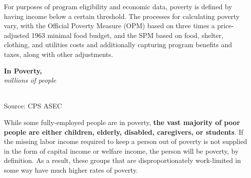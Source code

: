 \documentclass{report}
\newcommand{\barylab}[2]{yticklabel style={text width=#1, align=right, 
		style={black!70}, text height=#2},}
\newcommand{\bbar}[2]{extra #1 ticks = {{#2}}, extra #1 tick labels = ,
		extra #1 tick style = {grid=major, grid style={thick, black!25}},}
\newcommand{\barplotnogrid}{xbar=0pt, axis line style={draw=none},
	    yticklabel style={align=left, anchor=east},
      		xmajorticks=false, ymajorgrids=false,   
	    ytick=data, tickwidth=0pt, area legend, reverse legend,
	    nodes near coords align={horizontal},}
\begin{document}
{\begin{minipage}{0.76\textwidth}
For purposes of program eligibility and economic data, poverty is defined by having income below a certain threshold. The processes for calculating poverty vary, with the Official Poverty Measure (OPM) based on three times a price-adjusted 1963 minimal food budget, and the SPM based on food, shelter, clothing, and utilities costs and additionally capturing program benefits and taxes, along with other adjustments.
\end{minipage} \hspace{6mm}
\begin{minipage}{0.24\textwidth}
\normalsize \textbf{In Poverty, }\\
\footnotesize{\textit{millions of people}}\\
  \hspace*{-4mm} \\
\footnotesize{Source: CPS ASEC}
\vfill
\end{minipage}
\vspace{1mm}

\begin{minipage}{0.76\textwidth}
\small While some fully-employed people are in poverty, \textbf{the vast majority of poor people are either children, elderly, disabled, caregivers, or students}.  If the missing labor income required to keep a person out of poverty is not supplied in the form of capital income or welfare income, the person will be poverty, by definition. As a result, these groups that are disproportionately work-limited in some way have much higher rates of poverty. 
\vspace{1mm}


\end{minipage}}
\end{document}
